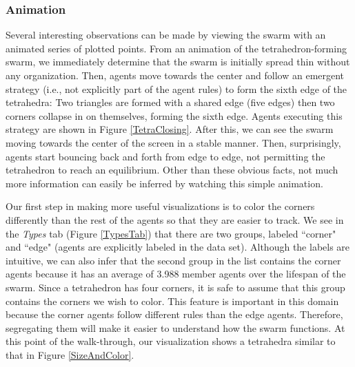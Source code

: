 \documentclass{vgtc}
\begin{document}
\subsubsection{Animation}

Several interesting observations can be made by viewing the swarm with an animated series of plotted points.
From an animation of the tetrahedron-forming swarm,
we immediately determine that the swarm is initially spread thin without any organization.
Then, agents move towards the center and follow an emergent strategy (i.e., not explicitly part of the agent rules)
to form the sixth edge of the tetrahedra: Two triangles are formed with a shared edge (five edges) then two corners collapse in on themselves, forming the sixth edge. Agents executing this strategy are shown in Figure \ref{TetraClosing}.
After this, we can see the swarm moving towards the center of the screen in a stable manner.
Then, surprisingly, agents start bouncing back and forth from edge to edge, not permitting the tetrahedron to
reach an equilibrium. Other than these obvious facts, not much more information can easily be inferred by watching this simple animation.

Our first step in making more useful visualizations is to color the corners differently than the rest of the agents so that
they are easier to track. We see in the \textit{Types} tab (Figure \ref{TypesTab}) that there are two groups, labeled
``corner" and ``edge" (agents are explicitly labeled in the data set). Although the labels are intuitive, we can also infer that the second group in the list contains the corner agents because it has an average of 3.988 member agents over the lifespan of the swarm.
Since a tetrahedron has four corners, it is safe to assume that this group contains the corners we wish to color.
This feature is important in this domain because the corner agents follow different rules than the edge agents.
Therefore, segregating them will make it easier to understand how the swarm functions.
At this point of the walk-through, our visualization shows a tetrahedra similar to that in Figure \ref{SizeAndColor}.

\end{document}
